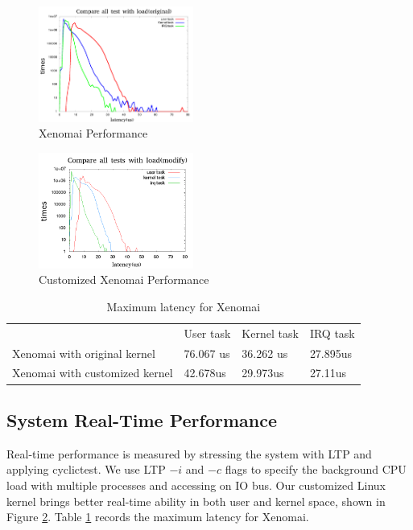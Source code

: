 \documentclass[conference]{IEEEtran}
\begin{document}
\begin{figure}	
	\centering
	\includegraphics[width=2in]{img/xenomai_load.png}
	\caption{Xenomai Performance}
	\label{fig:xeno_perf}
\end{figure}

\begin{figure}
	\centering
	\includegraphics[width=2in]{img/xenomai_load_modify.png}
	\caption{Customized Xenomai Performance}
	\label{fig:xeno_perf_modify}
\end{figure}

\begin{table}[]
\centering
\caption{Maximum latency for Xenomai}
\label{xeno_compare}
\begin{tabular}{llll}
                              & User task & Kernel task & IRQ task \\
Xenomai with original kernel  & 76.067 us & 36.262 us   & 27.895us \\
Xenomai with customized kernel & 42.678us  & 29.973us    & 27.11us 
\end{tabular}
\end{table}

\subsection{System Real-Time Performance}

Real-time performance is measured by stressing the system with LTP and applying cyclictest. \cite{cyclictest} We use LTP $-i$ and $-c$ flags to specify the background CPU load with multiple processes and accessing on IO bus. Our customized Linux kernel brings better real-time ability in both user and kernel space, shown in Figure \ref{fig:xeno_perf_modify}. Table \ref{xeno_compare} records the maximum latency for Xenomai.
\end{document}
